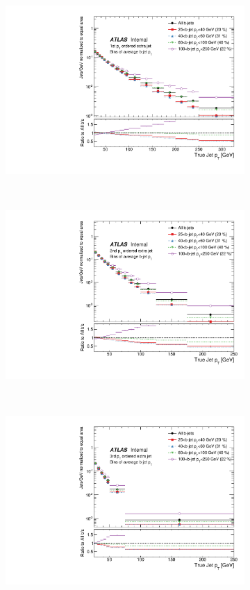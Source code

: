 \begin{figure}
\centering
\begin{subfigure}[]{0.33\textwidth}
\includegraphics[width=\textwidth]{fig/TruthNotReco/BJetPtJet0.pdf}
\end{subfigure}
~
\begin{subfigure}[]{0.33\textwidth}
\includegraphics[width=\textwidth]{fig/TruthNotReco/BJetPtJet1.pdf}
\end{subfigure}
~
\begin{subfigure}[]{0.33\textwidth}
\includegraphics[width=\textwidth]{fig/TruthNotReco/BJetPtJet2.pdf}

\end{subfigure}
\end{figure}
